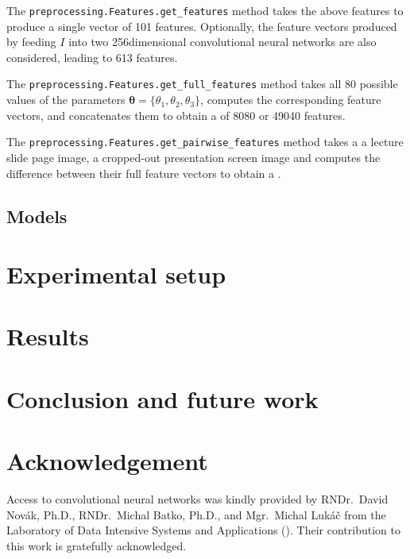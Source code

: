 The \texttt{preprocessing.Features.get\_features} method takes the above
features to produce a single vector of 101 features. Optionally, the feature
vectors produced by feeding $I$ into two 256dimensional 
convolutional neural networks are also considered, leading to 613 features.

The \texttt{preprocessing.Features.get\_full\_features} method takes all
80 possible values of the parameters
$\bm\theta=\{\theta_1,\theta_2,\theta_3\}$, computes the corresponding feature
vectors, and concatenates them to obtain a  of 8080 or 49040
features.

The \texttt{preprocessing.Features.get\_pairwise\_features} method takes a
a lecture slide page image, a cropped-out presentation screen image and
computes the difference between their full feature vectors to obtain a
.

\subsection{Models}

\section{Experimental setup}
\section{Results}
\section{Conclusion and future work}

\section*{Acknowledgement}

Access to  convolutional neural networks was kindly provided by
RNDr.\ David Novák, Ph.D., RNDr.\ Michal Batko, Ph.D., and Mgr.\ Michal Lukáč
from the Laboratory of Data Intensive Systems and Applications ().
Their contribution to this work is gratefully acknowledged.

\iffalse

